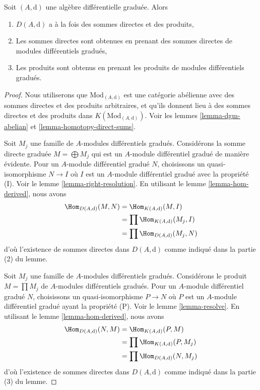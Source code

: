 \begin{lemma}
\label{lemma-derived-products}
Soit $(A, \text{d})$ une algèbre différentielle graduée. Alors
\begin{enumerate}
\item $D(A, \text{d})$ a à la fois des sommes directes et des produits,
\item Les sommes directes sont obtenues en prenant des sommes directes de modules
différentiels gradués,
\item Les produits sont obtenus en prenant les produits de modules
différentiels gradués.
\end{enumerate}
\end{lemma}

\begin{proof}
Nous utiliserons que $\text{Mod}_{(A, \text{d})}$ est une catégorie abélienne
avec des sommes directes et des produits arbitraires, et qu'ils donnent
lieu à des sommes directes et des produits dans $K(\text{Mod}_{(A,
\text{d})})$. Voir les lemmes \ref{lemma-dgm-abelian} et \ref{lemma-homotopy-direct-sums}.

\medskip\noindent
Soit $M_j$ une famille de $A$-modules différentiels gradués.
Considérons la somme directe graduée $M = \bigoplus M_j$ qui est un
$A$-module différentiel gradué de manière évidente. Pour un
$A$-module différentiel gradué $N$, choisissons un quasi-isomorphisme $N \to
I$ où $I$ est un $A$-module différentiel gradué avec la propriété (I). Voir le
lemme \ref{lemma-right-resolution}. En utilisant
le lemme \ref{lemma-hom-derived}, nous avons
\begin{align*}
\Hom_{D(A, \text{d})}(M, N)
& =
\Hom_{K(A, \text{d})}(M, I) \\ &
=
\prod \Hom_{K(A, \text{d})}(M_j, I) \\ & =
\prod
\Hom_{D(A, \text{d})}(M_j, N)
\end{align*}
d'où l'existence de sommes directes dans $D(A, \text{d})$ comme indiqué
dans la partie (2) du lemme.

\medskip\noindent
Soit $M_j$ une famille de $A$-modules différentiels gradués.
Considérons le produit $M = \prod M_j$ de $A$-modules différentiels gradués. Pour un
$A$-module différentiel gradué $N$, choisissons un quasi-isomorphisme $P \to
N$ où $P$ est un $A$-module différentiel gradué ayant la propriété (P). Voir le
lemme \ref{lemma-resolve}. En utilisant
le lemme \ref{lemma-hom-derived}, nous avons
\begin{align*}
\Hom_{D(A, \text{d})}(N, M)
& =
\Hom_{K(A, \text{d})}(P, M) \\ &
=
\prod \Hom_{K(A, \text{d})}(P, M_j) \\ & =
\prod
\Hom_{D(A, \text{d})}(N, M_j)
\end{align*}
d'où l'existence de sommes directes dans $D(A, \text{d})$ comme indiqué
dans la partie (3) du lemme.
\end{proof}

